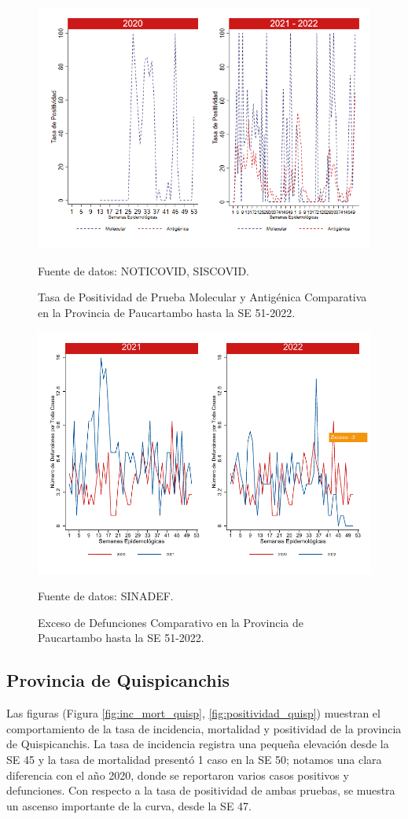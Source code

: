 \documentclass[12pt,a4paper,openany]{book}
\begin{document}
	\begin{figure}[h]
		\caption{Tasa de Positividad de Prueba Molecular y Antigénica Comparativa en la Provincia de Paucartambo hasta la SE 51-2022.}\label{fig:positividad_paucartam}
		\begin{center}
			\includegraphics[width=0.7\linewidth]{../figuras/positividad_20_21_11.png}
		\end{center}
		{\footnotesize {Fuente de datos: NOTICOVID, SISCOVID.}}
	\end{figure}
	
	\begin{figure}[h]
		\caption{Exceso de Defunciones Comparativo en la Provincia de Paucartambo hasta la SE 51-2022.}\label{fig:exceso_paucartam}
		\begin{center}
			\includegraphics[width=0.7\linewidth]{../figuras/exceso_11.pdf}
		\end{center}
		{\footnotesize {Fuente de datos: SINADEF.}}
	\end{figure}
	
	\clearpage
	
	\subsection*{Provincia de Quispicanchis}
	\noindent Las figuras (Figura \ref{fig:inc_mort_quisp}, \ref{fig:positividad_quisp}) muestran el comportamiento de la tasa de incidencia, mortalidad y positividad de la provincia de Quispicanchis. La tasa de incidencia registra una pequeña elevación desde la SE 45 y la tasa de mortalidad presentó 1 caso en la SE 50; notamos una clara diferencia con el año 2020, donde se reportaron varios casos positivos y defunciones. Con respecto a la tasa de positividad de ambas pruebas, se muestra un ascenso importante de la curva, desde la SE 47.
	
\end{document}
